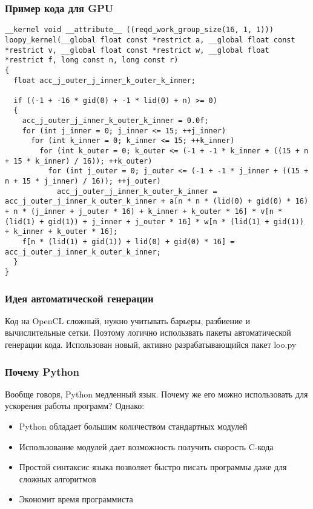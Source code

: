 \documentclass[presentation]{beamer}
\begin{document}
\begin{frame}[fragile]
\frametitle{Пример кода для GPU}
\label{sec-1-3}


\begin{verbatim}
__kernel void __attribute__ ((reqd_work_group_size(16, 1, 1))) loopy_kernel(__global float const *restrict a, __global float const *restrict v, __global float const *restrict w, __global float *restrict f, long const n, long const r)
{
  float acc_j_outer_j_inner_k_outer_k_inner;

  if ((-1 + -16 * gid(0) + -1 * lid(0) + n) >= 0)
  {
    acc_j_outer_j_inner_k_outer_k_inner = 0.0f;
    for (int j_inner = 0; j_inner <= 15; ++j_inner)
      for (int k_inner = 0; k_inner <= 15; ++k_inner)
        for (int k_outer = 0; k_outer <= (-1 + -1 * k_inner + ((15 + n + 15 * k_inner) / 16)); ++k_outer)
          for (int j_outer = 0; j_outer <= (-1 + -1 * j_inner + ((15 + n + 15 * j_inner) / 16)); ++j_outer)
            acc_j_outer_j_inner_k_outer_k_inner = acc_j_outer_j_inner_k_outer_k_inner + a[n * n * (lid(0) + gid(0) * 16) + n * (j_inner + j_outer * 16) + k_inner + k_outer * 16] * v[n * (lid(1) + gid(1)) + j_inner + j_outer * 16] * w[n * (lid(1) + gid(1)) + k_inner + k_outer * 16];
    f[n * (lid(1) + gid(1)) + lid(0) + gid(0) * 16] = acc_j_outer_j_inner_k_outer_k_inner;
  }
}
\end{verbatim}
\end{frame}
\begin{frame}
\frametitle{Идея автоматической генерации}
\label{sec-1-4}

Код на OpenCL сложный, нужно учитывать барьеры, разбиение и вычислительные сетки.
Поэтому логично использвать пакеты автоматической генерации кода. 
Использован новый, активно разрабатывающийся пакет loo.py
\end{frame}
\begin{frame}
\frametitle{Почему Python}
\label{sec-1-5}

Вообще говоря, Python медленный язык. Почему же его можно использовать для ускорения работы программ?
Однако:
\begin{itemize}
\item Python обладает большим количеством стандартных модулей
\item Использование модулей дает возможность получить скорость C-кода
\item Простой синтаксис языка позволяет быстро писать программы даже для сложных алгоритмов
\item Экономит время программиста
\end{itemize}
\end{frame}
\end{document}
